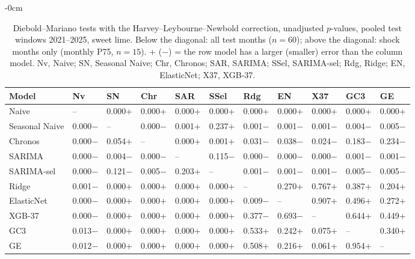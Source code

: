 \begin{table}[H]
\centering
\footnotesize
\setlength{\tabcolsep}{4pt}
\caption{Diebold--Mariano tests with the Harvey--Leybourne--Newbold correction, unadjusted $p$-values, pooled test windows 2021--2025, sweet lime. Below the diagonal: all test months ($n=60$); above the diagonal: shock months only (monthly P75, $n=15$). + ($-$) = the row model has a larger (smaller) error than the column model. Nv, Naive; SN, Seasonal Naive; Chr, Chronos; SAR, SARIMA; SSel, SARIMA-sel; Rdg, Ridge; EN, ElasticNet; X37, XGB-37.}
\label{tab:T09_DM_matriz_principal_2021_2025_dulce}
\begin{adjustwidth}{-\extralength}{0cm}
\centering
\begin{tabular}{lllllllllll}
\toprule
Model & Nv & SN & Chr & SAR & SSel & Rdg & EN & X37 & GC3 & GE \\
\midrule
Naive & -- & 0.000+ & 0.000+ & 0.000+ & 0.000+ & 0.000+ & 0.000+ & 0.000+ & 0.000+ & 0.000+ \\
Seasonal Naive & 0.000$-$ & -- & 0.000$-$ & 0.001+ & 0.237+ & 0.001$-$ & 0.001$-$ & 0.001$-$ & 0.004$-$ & 0.005$-$ \\
Chronos & 0.000$-$ & 0.054+ & -- & 0.000+ & 0.001+ & 0.031$-$ & 0.038$-$ & 0.024$-$ & 0.183$-$ & 0.234$-$ \\
SARIMA & 0.000$-$ & 0.004$-$ & 0.000$-$ & -- & 0.115$-$ & 0.000$-$ & 0.000$-$ & 0.000$-$ & 0.001$-$ & 0.001$-$ \\
SARIMA-sel & 0.000$-$ & 0.121$-$ & 0.005$-$ & 0.203+ & -- & 0.001$-$ & 0.001$-$ & 0.001$-$ & 0.005$-$ & 0.005$-$ \\
Ridge & 0.001$-$ & 0.000+ & 0.000+ & 0.000+ & 0.000+ & -- & 0.270+ & 0.767+ & 0.387+ & 0.204+ \\
ElasticNet & 0.000$-$ & 0.000+ & 0.000+ & 0.000+ & 0.000+ & 0.009$-$ & -- & 0.907+ & 0.496+ & 0.272+ \\
XGB-37 & 0.000$-$ & 0.000+ & 0.000+ & 0.000+ & 0.000+ & 0.377$-$ & 0.693$-$ & -- & 0.644+ & 0.449+ \\
GC3 & 0.013$-$ & 0.000+ & 0.000+ & 0.000+ & 0.000+ & 0.533+ & 0.242+ & 0.075+ & -- & 0.340+ \\
GE & 0.012$-$ & 0.000+ & 0.000+ & 0.000+ & 0.000+ & 0.508+ & 0.216+ & 0.061+ & 0.954+ & -- \\
\bottomrule
\end{tabular}
\end{adjustwidth}
\end{table}

